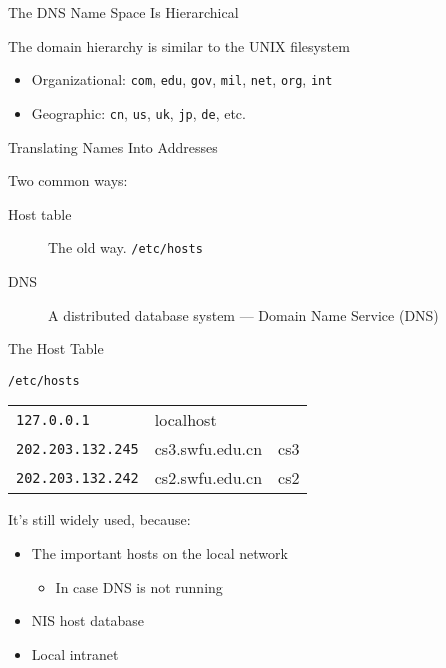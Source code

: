 \begin{frame}{The DNS Name Space Is Hierarchical}
  \begin{iblock}{The domain hierarchy is similar to the UNIX filesystem}
    \begin{center}
    \end{center}\label{fig:dns_tree}
  \end{iblock}
  \begin{itemize}
  \item Organizational: \texttt{com}, \texttt{edu}, \texttt{gov}, \texttt{mil}, \texttt{net},
    \texttt{org}, \texttt{int}
  \item Geographic: \texttt{cn}, \texttt{us}, \texttt{uk}, \texttt{jp}, \texttt{de}, etc.
  \end{itemize}
\end{frame}

\begin{frame}{Translating Names Into Addresses}
  \begin{iblock}{Two common ways:}
    \begin{description}
    \item[Host table] The old way. \texttt{/etc/hosts}
    \item[DNS] A distributed database system --- Domain Name Service (DNS)
    \end{description}
  \end{iblock}
\end{frame}

\begin{frame}{The Host Table}
  \begin{iblock}{\texttt{/etc/hosts}}
    \begin{center}
      \begin{tabular}{lll}
        \texttt{127.0.0.1}&localhost&\\
        \texttt{202.203.132.245}&cs3.swfu.edu.cn&cs3\\
        \texttt{202.203.132.242}&cs2.swfu.edu.cn&cs2
      \end{tabular}
    \end{center}
  \end{iblock}
  \begin{iblock}{It's still widely used, because:}
    \begin{itemize}
    \item The important hosts on the local network
      \begin{itemize}
      \item In case DNS is not running
      \end{itemize}
    \item NIS host database
    \item Local intranet
    \end{itemize}
  \end{iblock}
\end{frame}

